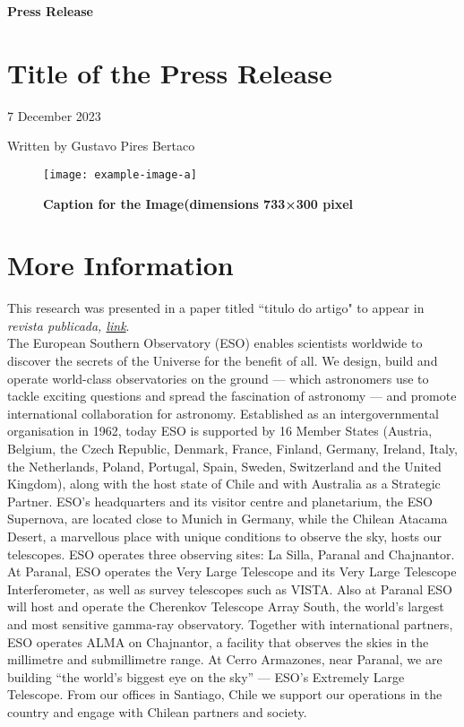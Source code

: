 \documentclass{article}
\begin{document}
\begin{flushleft}
    \textbf{Press Release}
\end{flushleft}

\section*{\Huge Title of the Press Release}

\begin{flushleft}
    7 December 2023
\end{flushleft}
\begin{flushleft}
    Written by Gustavo Pires Bertaco
\end{flushleft}

\begin{figure}[h]
    \centering
    \texttt{[image: example-image-a]}
    \caption*{\textbf{Caption for the Image(dimensions 733×300 pixel}}
\end{figure}

\lipsum[1-3]

\section*{\LARGE More Information}

This research was presented in a paper titled “titulo do artigo" to appear in \textit{ revista publicada, \href{Link}{link}}.\\ 



The European Southern Observatory (ESO) enables scientists worldwide to discover the secrets of the Universe for the benefit of all. We design, build and operate world-class observatories on the ground — which astronomers use to tackle exciting questions and spread the fascination of astronomy — and promote international collaboration for astronomy. Established as an intergovernmental organisation in 1962, today ESO is supported by 16 Member States (Austria, Belgium, the Czech Republic, Denmark, France, Finland, Germany, Ireland, Italy, the Netherlands, Poland, Portugal, Spain, Sweden, Switzerland and the United Kingdom), along with the host state of Chile and with Australia as a Strategic Partner. ESO’s headquarters and its visitor centre and planetarium, the ESO Supernova, are located close to Munich in Germany, while the Chilean Atacama Desert, a marvellous place with unique conditions to observe the sky, hosts our telescopes. ESO operates three observing sites: La Silla, Paranal and Chajnantor. At Paranal, ESO operates the Very Large Telescope and its Very Large Telescope Interferometer, as well as survey telescopes such as VISTA. Also at Paranal ESO will host and operate the Cherenkov Telescope Array South, the world’s largest and most sensitive gamma-ray observatory. Together with international partners, ESO operates ALMA on Chajnantor, a facility that observes the skies in the millimetre and submillimetre range. At Cerro Armazones, near Paranal, we are building “the world’s biggest eye on the sky” — ESO’s Extremely Large Telescope. From our offices in Santiago, Chile we support our operations in the country and engage with Chilean partners and society. 
\end{document}
